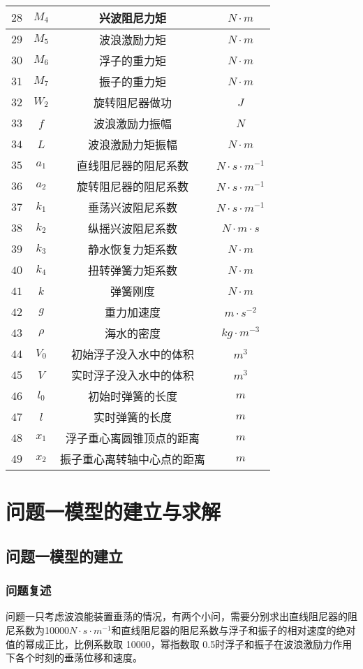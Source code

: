 \documentclass[a4paper,12pt]{article}
\begin{document}
\begin{longtable}{cccc}
		$28$&$M_4$&兴波阻尼力矩&$N\cdot m$\\\hline
		$29$&$M_5$&波浪激励力矩&$N\cdot m$\\\hline
		$30$&$M_6$&浮子的重力矩&$N\cdot m$\\\hline
		$31$&$M_7$&振子的重力矩&$N\cdot m$\\\hline
		$32$&$W_2$&旋转阻尼器做功&$J$\\\hline
		$33$&$f$&波浪激励力振幅&$N$\\\hline
		$34$&$L$&波浪激励力矩振幅&$N\cdot m$\\\hline
		$35$&$a_1$&直线阻尼器的阻尼系数&$N\cdot s\cdot m^{-1}$\\\hline 
		$36$&$a_2$&旋转阻尼器的阻尼系数&$N\cdot s\cdot m^{-1}$\\\hline
		$37$&$k_1$&垂荡兴波阻尼系数&$N\cdot s\cdot m^{-1}$\\\hline  
		$38$&$k_2$&纵摇兴波阻尼系数&$N\cdot m\cdot s$\\\hline
		$39$&$k_3$&静水恢复力矩系数&$N\cdot m$\\\hline
		$40$&$k_4$&扭转弹簧力矩系数&$N\cdot m$\\\hline
		$41$&$k$&弹簧刚度&$N\cdot m$\\\hline  
		$42$&$g$&重力加速度&$m\cdot s^{-2}$\\\hline 
		$43$&$\rho$&海水的密度&$kg\cdot m^{-3}$\\\hline
		$44$&$V_0$&初始浮子没入水中的体积&$m^3$\\\hline
		$45$&$V$&实时浮子没入水中的体积&$m^3$\\\hline
		$46$&$l_0 $&初始时弹簧的长度&$m$\\\hline
		$47$&$l$&实时弹簧的长度&$m$\\\hline
		$48$&$x_1$&浮子重心离圆锥顶点的距离&$m$\\\hline
		$49$&$x_2$&振子重心离转轴中心点的距离&$m$\\\hline
	\end{longtable}

	\section{问题一模型的建立与求解}
	\subsection{问题一模型的建立}
	\subsubsection{问题复述}
	问题一只考虑波浪能装置垂荡的情况，有两个小问，需要分别求出直线阻尼器的阻尼系数为10000$N\cdot s\cdot m^{-1}$和直线阻尼器的阻尼系数与浮子和振子的相对速度的绝对值的幂成正比，比例系数取 10000，幂指数取 0.5时浮子和振子在波浪激励力作用下各个时刻的垂荡位移和速度。
\end{document}
